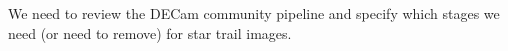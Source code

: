 \documentclass[11pt]{article}
\begin{document}



%
%




\specialrequest
We need to review the DECam community pipeline and specify which stages we need (or need to remove) for star trail images.

\end{document}
